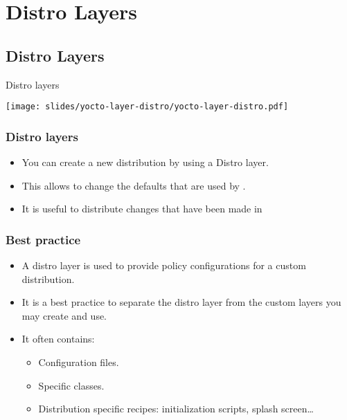 \section{Distro Layers}

\subsection{Distro Layers}

\begin{frame}{Distro layers}
  \begin{center}
    \texttt{[image: slides/yocto-layer-distro/yocto-layer-distro.pdf]}
  \end{center}
\end{frame}

\begin{frame}
  \frametitle{Distro layers}
  \begin{itemize}
    \item You can create a new distribution by using a Distro layer.
    \item This allows to change the defaults that are used by
      .
    \item It is useful to distribute changes that have been made in
  \end{itemize}
\end{frame}

\begin{frame}
  \frametitle{Best practice}
  \begin{itemize}
    \item A distro layer is used to provide policy configurations for
      a custom distribution.
    \item It is a best practice to separate the distro layer from the
      custom layers you may create and use.
    \item It often contains:
      \begin{itemize}
        \item Configuration files.
        \item Specific classes.
        \item Distribution specific recipes: initialization scripts,
          splash screen\dots
      \end{itemize}
  \end{itemize}
\end{frame}

